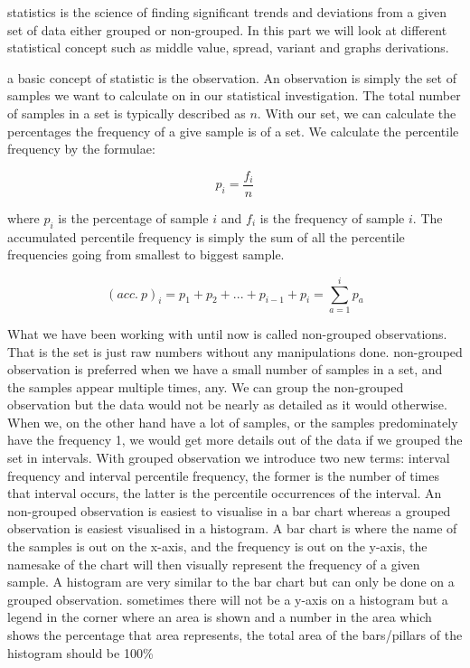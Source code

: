 
statistics is the science of finding significant trends and deviations from a given set of data either grouped or non-grouped. In this part we will look at different statistical concept such as middle value, spread, variant and graphs derivations. 

a basic concept of statistic is the observation. An observation is simply the set of samples we want to calculate on in our statistical investigation. The total number of samples in a set is typically described as \(n\). With our set, we can calculate the percentages the frequency of a give sample is of a set. We calculate the percentile frequency by the formulae: 
 
\[ p_i = \frac{f_i} {n} \]
 
where \(p_i\) is the percentage of sample \(i\) and \(f_i\) is the frequency of sample \(i\). The accumulated percentile frequency is simply the sum of all the percentile frequencies going from smallest to biggest sample.

\[ (acc.\ p)_i = p_1 + p_2 + ... + p_{i-1} + p_i = \sum\limits_{a=1}^i p_a \]

What we have been working with until now is called non-grouped observations. That is the set is just raw numbers without any manipulations done. non-grouped observation is preferred when we have a small number of samples in a set, and the samples appear multiple times, any. We can group the non-grouped observation but the data would not be nearly as detailed as it would otherwise. When we, on the other hand have a lot of samples, or the samples predominately have the frequency 1, we would get more details out of the data if we grouped the set in intervals. With grouped observation we introduce two new terms: interval frequency and interval percentile frequency, the former is the number of times that interval occurs, the latter is the percentile occurrences of the interval. 
An non-grouped observation is easiest to visualise in a bar chart whereas a grouped observation is easiest visualised in a histogram. A bar chart is where the name of the samples is out on the x-axis, and the frequency is out on the y-axis, the namesake of the chart will then visually represent the frequency of a given sample. A histogram are very similar to the bar chart but can only be done on a grouped observation. sometimes there will not be a y-axis on a histogram but a legend in the corner where an area is shown and a number in the area which shows the percentage that area represents, the total area of the bars/pillars of the histogram should be 100\%  

